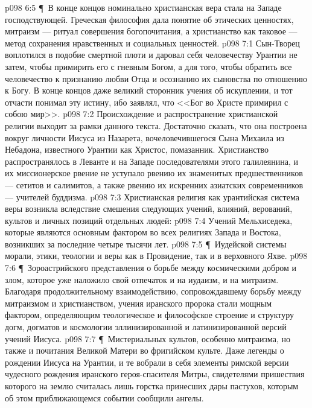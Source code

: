 \vs p098 6:5 \P\ В конце концов номинально христианская вера стала на Западе господствующей. Греческая философия дала понятие об этических ценностях, митраизм --- ритуал совершения богопочитания, а христианство как таковое --- метод сохранения нравственных и социальных ценностей.
\vs p098 7:1 Сын\hyp{}Творец воплотился в подобие смертной плоти и даровал себя человечеству Урантии не затем, чтобы примирить его с гневным Богом, а для того, чтобы обратить все человечество к признанию любви Отца и осознанию их сыновства по отношению к Богу. В конце концов даже великий сторонник учения об искуплении, и тот отчасти понимал эту истину, ибо заявлял, что <<Бог во Христе примирил с собою мир>>.
\vs p098 7:2 Происхождение и распространение христианской религии выходит за рамки данного текста. Достаточно сказать, что она построена вокруг личности Иисуса из Назарета, вочеловечившегося Сына Михаила из Небадона, известного Урантии как Христос, помазанник. Христианство распространялось в Леванте и на Западе последователями этого галилеянина, и их миссионерское рвение не уступало рвению их знаменитых предшественников --- сетитов и салимитов, а также рвению их искренних азиатских современников --- учителей буддизма.
\vs p098 7:3 Христианская религия как урантийская система веры возникла вследствие смешения следующих учений, влияний, верований, культов и личных позиций отдельных людей:
\vs p098 7:4 \bibnobreakspace Учений Мельхиседека, которые являются основным фактором во всех религиях Запада и Востока, возникших за последние четыре тысячи лет.
\vs p098 7:5 \P\ \bibnobreakspace Иудейской системы морали, этики, теологии и веры как в Провидение, так и в верховного Яхве.
\vs p098 7:6 \P\ \bibnobreakspace Зороастрийского представления о борьбе между космическими добром и злом, которое уже наложило свой отпечаток и на иудаизм, и на митраизм. Благодаря продолжительному взаимодействию, сопровождавшему борьбу между митраизмом и христианством, учения иранского пророка стали мощным фактором, определяющим теологическое и философское строение и структуру догм, догматов и космологии эллинизированной и латинизированной версий учений Иисуса.
\vs p098 7:7 \P\ \bibnobreakspace Мистериальных культов, особенно митраизма, но также и почитания Великой Матери во фригийском культе. Даже легенды о рождении Иисуса на Урантии, и те вобрали в себя элементы римской версии чудесного рождения иранского героя\hyp{}спасителя Митры, свидетелями пришествия которого на землю считалась лишь горстка принесших дары пастухов, которым об этом приближающемся событии сообщили ангелы.
